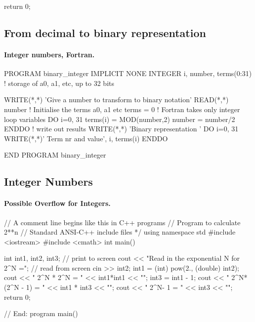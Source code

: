 \documentclass[%
oneside,                 %
final,                   %
10pt]{article}
\begin{document}
{{{{  return 0;

\ecppcod



\subsection{From decimal to binary representation}


\paragraph{Integer numbers, Fortran.}
\bfcod
PROGRAM binary_integer
IMPLICIT NONE
  INTEGER  i, number, terms(0:31) ! storage of a0, a1, etc, up to 32 bits

  WRITE(*,*) 'Give a number to transform to binary notation'
  READ(*,*) number
! Initialise the terms a0, a1 etc
  terms = 0
! Fortran takes only integer loop variables
  DO i=0, 31
     terms(i) = MOD(number,2)
     number = number/2
  ENDDO
! write out results
  WRITE(*,*) 'Binary representation '
  DO i=0, 31
    WRITE(*,*)' Term nr and value', i, terms(i)
  ENDDO

END PROGRAM binary_integer
\efcod



\subsection{Integer Numbers}


\paragraph{Possible Overflow for Integers.}
\bcppcod
// A comment line begins like this in C++ programs
// Program to calculate 2**n
// Standard ANSI-C++ include files */
using namespace std
#include <iostream>
#include <cmath>
int main()
{
   int  int1, int2, int3;
// print to screen
   cout << "Read in the exponential N for 2^N =\n";
// read from screen
   cin >> int2;
   int1 = (int) pow(2., (double) int2);
   cout << " 2^N * 2^N = " << int1*int1 << "\n";
   int3 = int1 - 1;
   cout << " 2^N*(2^N - 1) = " << int1 * int3  << "\n";
   cout << " 2^N- 1 = " << int3  << "\n";
   return 0;

// End: program main()
\ecppcod



}}}}}
\end{document}
